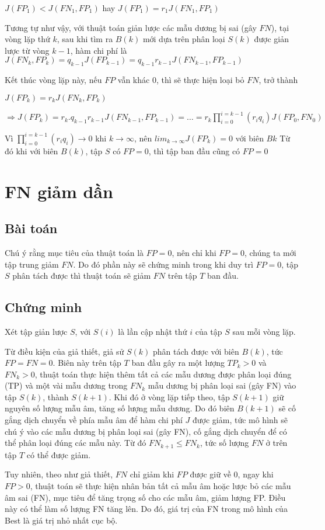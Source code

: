 \documentclass[./../main.tex]{subfiles}
\begin{document}
$J(FP_1) < J(FN_1, FP_1)$ hay $J(FP_1) = r_1 J(FN_1,FP_1)$

Tương tự như vậy, với thuật toán giản lược các mẫu dương bị sai (gây $FN$), tại vòng lặp thứ $k$, sau khi tìm ra $B(k)$ mới dựa trên phân loại $S(k)$ được giản lược từ vòng $k-1$, hàm chi phí là $J(FN_k, FP_k) = q_{k-1} J(FP_{k-1}) = q_{k-1} r_{k-1} J(FN_{k-1},FP_{k-1})$

Kết thúc vòng lặp này, nếu $FP$ vẫn khác 0, thì sẽ thực hiện loại bỏ $FN$, trở thành


$J(FP_k) = r_k J(FN_k, FP_k)$


$\Rightarrow J(FP_k) = r_k .q_{k-1} r_{k-1} J(FN_{k-1},FP_{k-1}) = \ldots =  r_k \prod_{i=0}^{i=k-1}(r_i q_i) J(FP_0, FN_0)$

Vì $\prod_{i=0}^{i=k-1}(r_i q_i) \rightarrow 0$ khi $k \to \infty$, nên $lim_{k \to \infty} J(FP_k) = 0$ với biên $Bk$
Từ đó khi với biên $B(k)$, tập $S$ có $FP = 0$, thì tập ban đầu cũng có $FP=0$

\section{FN giảm dần}

\subsection*{Bài toán}
Chú ý rằng mục tiêu của thuật toán là $FP = 0$, nên chỉ khi $FP=0$, chúng ta mới tập trung giảm $FN$. Do đó phần này sẽ chứng minh trong khi duy trì $FP=0$, tập $S$ phân tách được thì thuật toán sẽ giảm $FN$ trên tập $T$ ban đầu.
\subsection*{Chứng minh}
Xét tập giản lược $S$, với $S(i)$ là lần cập nhật thứ $i$ của tập $S$ sau mỗi vòng lặp.

Từ điều kiện của giả thiết, giả sử $S(k)$ phân tách được với biên $B(k)$, tức $FP=FN=0$. Biên này trên tập $T$ ban đầu gây ra một lượng $TP_k>0$ và $FN_k>0$, thuật toán thực hiện thêm tất cả các mẫu dương được phân loại đúng (TP) và một vài mẫu dương trong $FN_k$ mẫu dương bị phân loại sai (gây FN) vào tập $S(k)$, thành $S(k+1)$. Khi đó ở vòng lặp tiếp theo, tập $S(k+1)$ giữ nguyên số lượng mẫu âm, tăng số lượng mẫu dương. Do đó biên $B(k+1)$ sẽ cố gắng dịch chuyển về phía mẫu âm để hàm chi phí $J$ được giảm, tức mô hình sẽ chú ý vào các mẫu dương bị phân loại sai (gây FN), cố gắng dịch chuyển để có thể phân loại đúng các mẫu này. Từ đó $FN_{k+1} \leq FN_k$, tức số lượng $FN$ ở trên tập $T$ có thể được giảm.

Tuy nhiên, theo như giả thiết, $FN$ chỉ giảm khi $FP$ được giữ về 0, ngay khi $FP >0$, thuật toán sẽ thực hiện nhân bản tất cả mẫu âm hoặc lược bỏ các mẫu âm sai (FN), mục tiêu để tăng trọng số cho các mẫu âm, giảm lượng FP. Điều này có thể làm số lượng FN tăng lên. Do đó, giá trị của FN trong mô hình của Best là giá trị nhỏ nhất cục bộ.
\end{document}
